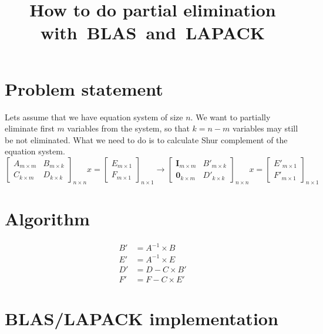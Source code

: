 \documentclass[12pt]{article}
\title{How to do partial elimination with BLAS and LAPACK}
\begin{document}
\maketitle

\section{Problem statement}
Lets assume that we have equation system of size $n$. We want to partially eliminate first $m$ variables from the system, so that $k = n - m$ variables may still be not eliminated. What we need to do is to calculate Shur complement of the equation system.
\begin{equation}
    \begin{bmatrix}
    A_{m × m} & B_{m × k} \\
    C_{k × m} & D_{k × k}
    \end{bmatrix}_{n × n} x = \begin{bmatrix}
    E_{m × 1} \\
    F_{m × 1} 
    \end{bmatrix}_{n × 1}
\longrightarrow
    \begin{bmatrix}
    \boldsymbol{I}_{m × m} & B'_{m × k} \\
    \boldsymbol{0}_{k × m} & D'_{k × k}
    \end{bmatrix}_{n × n} x = \begin{bmatrix}
    E'_{m × 1} \\
    F'_{m × 1} 
    \end{bmatrix}_{n × 1}
\end{equation}

\section{Algorithm}
\begin{align}
\label{step1}    B' &= A^{-1} \times B \\ 
\label{step2}    E' &= A^{-1} \times E \\
\label{step3}    D' &= D - C \times B' \\
\label{step4}    F' &= F - C \times E'
\end{align}


\section{BLAS/LAPACK implementation}
\end{document}

